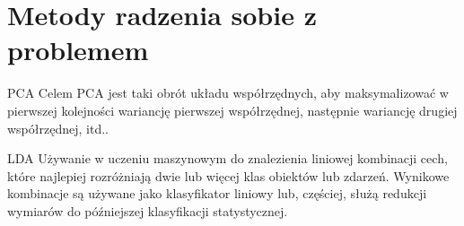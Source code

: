 \documentclass[a4paper]{beamer}
\begin{document}
\section{Metody radzenia sobie z problemem}
\begin{frame}
\begin{block}{PCA}
Celem PCA jest taki obrót układu współrzędnych, aby maksymalizować w pierwszej kolejności wariancję pierwszej współrzędnej, następnie wariancję drugiej współrzędnej, itd.. 
\end{block}
\begin{block}{LDA}
Używanie w uczeniu maszynowym do znalezienia liniowej kombinacji cech, które najlepiej rozróżniają dwie lub więcej klas obiektów lub zdarzeń. Wynikowe kombinacje są używane jako klasyfikator liniowy lub, częściej, służą redukcji wymiarów do późniejszej klasyfikacji statystycznej.
\end{block}
\end{frame}
\end{document}
